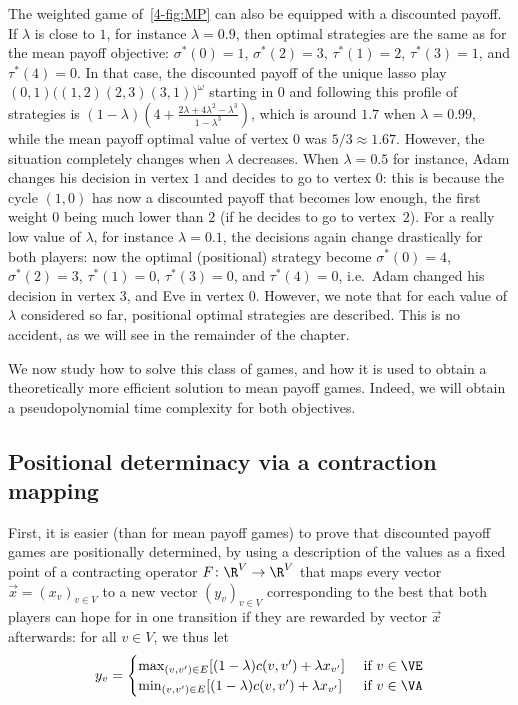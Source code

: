 The weighted game of~\cref{4-fig:MP} can also be equipped with a
discounted payoff. If $\lambda$ is close to $1$, for instance
$\lambda=0.9$, then optimal strategies are the same as for the
mean payoff objective: $\sigma^*(0)=1$, $\sigma^*(2)=3$,
$\tau^*(1)=2$, $\tau^*(3)=1$, and $\tau^*(4)=0$. In that case, the
discounted payoff of the unique lasso play
$(0,1)\big((1,2)(2,3)(3,1)\big)^\omega$ starting in $0$ and following
this profile of strategies is
$(1-\lambda)\left(4+
  \frac{2\lambda+4\lambda^2-\lambda^3}{1-\lambda^3}\right)$, which is
around $1.7$ when $\lambda=0.99$, while the mean payoff optimal value
of vertex 0 was $5/3\approx 1.67$. However, the situation completely
changes when $\lambda$ decreases. When $\lambda=0.5$ for instance,
Adam changes his decision in vertex $1$ and decides to go to vertex
$0$: this is because the cycle $(1,0)$ has now a discounted payoff
that becomes low enough, the first weight $0$ being much lower than
$2$ (if he decides to go to vertex~$2$). For a really low value of
$\lambda$, for instance $\lambda=0.1$, the decisions again change
drastically for both players: now the optimal (positional) strategy
become $\sigma^*(0)=4$, $\sigma^*(2)=3$, $\tau^*(1)=0$, $\tau^*(3)=0$,
and $\tau^*(4)=0$, i.e.~Adam changed his decision in vertex $3$, and
Eve in vertex $0$. However, we note that for each value of $\lambda$
considered so far, positional optimal strategies are described. This
is no accident, as we will see in the remainder of the chapter.

We now study how to solve this class of games, and how it is used to
obtain a theoretically more efficient solution to mean payoff
games. Indeed, we will obtain a pseudopolynomial time complexity for
both objectives.

\subsection*{Positional determinacy via a contraction mapping}

First, it is easier (than for mean payoff games) to prove that
discounted payoff games are positionally determined, by using a
description of the values as a fixed point of a contracting operator
$F\colon \R^V\to \R^V$ that maps every vector $\vec x=(x_v)_{v\in V}$
to a new vector $(y_v)_{v\in V}$ corresponding to the best that both
players can hope for in one transition if they are rewarded by vector
$\vec x$ afterwards: for all $v\in V$, we thus let
\begin{equation}y_v =
  \begin{cases}
    \max_{(v,v')\in E} [(1-\lambda) c(v,v') + \lambda x_{v'}] &
    \text{ if } v\in \VE\\
    \min_{(v,v')\in E} [(1-\lambda) c(v,v') + \lambda x_{v'}] &
    \text{ if } v\in \VA\\
  \end{cases}\label{4-eq:F-contraction}
\end{equation}

